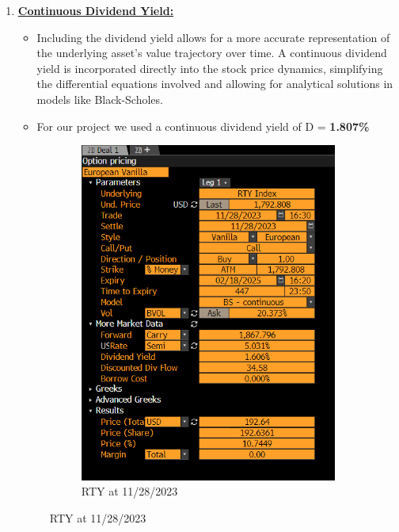 \documentclass[12pt,a4paper]{article}
\begin{document}
\begin{enumerate}
\item \underline{\textbf{Continuous Dividend Yield:}}
	\begin{itemize}
	\item  Including the dividend yield allows for a more accurate representation of the underlying asset’s value trajectory over time. A continuous dividend yield is incorporated directly into the stock price dynamics, simplifying the differential equations involved and allowing for analytical solutions in models like Black-Scholes.
	\item For our project we used a continuous dividend yield of D = \textbf{1.807\%} 
	\end{itemize}

\begin{figure}[H]
    \centering
    \begin{subfigure}{0.48\textwidth}
        \centering
        \includegraphics[width=\textwidth, height=0.4\textheight]{images_project_3/rty_div.png}
        \caption{RTY at 11/28/2023}

\end{subfigure}
\end{figure}
\end{enumerate}
\end{document}
